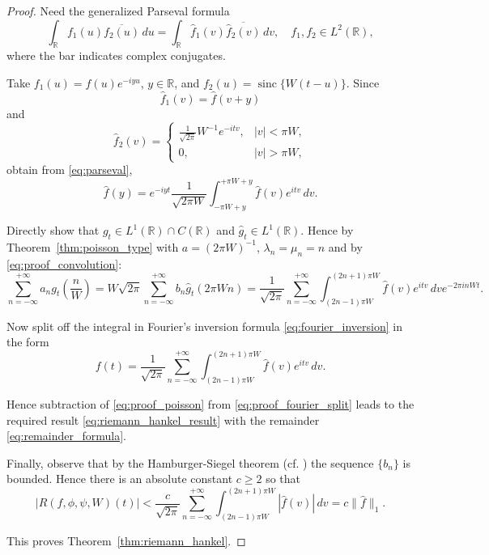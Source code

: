 \documentclass[11pt]{article}
\theoremstyle{plain}
\begin{document}
\begin{proof}
Need the generalized Parseval formula
\begin{equation}
\int_{\mathbb{R}} f_1(u) \overline{f_2(u)} \, du = \int_{\mathbb{R}} \hat{f}_1(v) \overline{\hat{f}_2(v)} \, dv, \quad f_1, f_2 \in L^2(\mathbb{R}),
\label{eq:parseval}
\end{equation}
where the bar indicates complex conjugates.

Take $f_1(u) = f(u) e^{-iyu}$, $y \in \mathbb{R}$, and $f_2(u) = \operatorname{sinc}\{W(t - u)\}$. Since
\begin{equation}
\hat{f}_1(v) = \hat{f}(v + y)
\label{eq:proof_f1_hat}
\end{equation}
and
\begin{equation}
\hat{f}_2(v) = \begin{cases}
\frac{1}{\sqrt{2\pi}} W^{-1} e^{-itv}, & |v| < \pi W, \\
0, & |v| > \pi W,
\end{cases}
\label{eq:proof_f2_hat}
\end{equation}
obtain from \eqref{eq:parseval},
\begin{equation}
\hat{f}(y) = e^{-iyt} \frac{1}{\sqrt{2\pi W}} \int_{-\pi W + y}^{+\pi W + y} \hat{f}(v) e^{itv} \, dv.
\label{eq:proof_convolution}
\end{equation}

Directly show that $g_t \in L^1(\mathbb{R}) \cap C(\mathbb{R})$ and $\hat{g}_t \in L^1(\mathbb{R})$. Hence by Theorem~\ref{thm:poisson_type} with $a = (2\pi W)^{-1}$, $\lambda_n = \mu_n = n$ and by \eqref{eq:proof_convolution}:
\begin{equation}
\sum_{n=-\infty}^{+\infty} a_n g_t\left(\frac{n}{W}\right) = W\sqrt{2\pi} \sum_{n=-\infty}^{+\infty} b_n \hat{g}_t(2\pi W n)
= \frac{1}{\sqrt{2\pi}} \sum_{n=-\infty}^{+\infty} \int_{(2n-1)\pi W}^{(2n+1)\pi W} \hat{f}(v) e^{itv} \, dv e^{-2\pi i n W t}.
\label{eq:proof_poisson}
\end{equation}

Now split off the integral in Fourier's inversion formula \eqref{eq:fourier_inversion} in the form
\begin{equation}
f(t) = \frac{1}{\sqrt{2\pi}} \sum_{n=-\infty}^{+\infty} \int_{(2n-1)\pi W}^{(2n+1)\pi W} \hat{f}(v) e^{itv} \, dv.
\label{eq:proof_fourier_split}
\end{equation}

Hence subtraction of \eqref{eq:proof_poisson} from \eqref{eq:proof_fourier_split} leads to the required result \eqref{eq:riemann_hankel_result} with the remainder \eqref{eq:remainder_formula}.

Finally, observe that by the Hamburger-Siegel theorem (cf. \cite{19,29,30}) the sequence $\{b_n\}$ is bounded. Hence there is an absolute constant $c \geq 2$ so that
\begin{equation}
|R(f, \phi, \psi, W)(t)| < \frac{c}{\sqrt{2\pi}} \sum_{n=-\infty}^{+\infty} \int_{(2n-1)\pi W}^{(2n+1)\pi W} |\hat{f}(v)| \, dv = c \|\hat{f}\|_1.
\label{eq:remainder_bound}
\end{equation}

This proves Theorem~\ref{thm:riemann_hankel}.
\end{proof}
\end{document}
